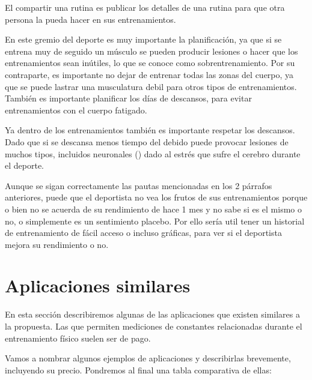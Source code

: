 El compartir una rutina es publicar los detalles de una rutina para que otra persona la pueda hacer en sus entrenamientos.

En este gremio del deporte es muy importante la planificación, ya que si se entrena muy de seguido un músculo se pueden producir lesiones o hacer que los entrenamientos sean inútiles, lo que se conoce como sobrentrenamiento. Por su contraparte, es importante no dejar de entrenar todas las zonas del cuerpo, ya que se puede lastrar una musculatura debil para otros tipos de entrenamientos. También es importante planificar los días de descansos, para evitar entrenamientos con el cuerpo fatigado. 

Ya dentro de los entrenamientos también es importante respetar los descansos. Dado que si se descansa menos tiempo del debido puede provocar lesiones de muchos tipos, incluidos neuronales (\cite{leonard2018impact}) dado al estrés que sufre el cerebro durante el deporte.

Aunque se sigan correctamente las pautas mencionadas en los 2 párrafos anteriores, puede que el deportista no vea los frutos de sus entrenamientos porque o bien no se acuerda de su rendimiento de hace 1 mes y no sabe si es el mismo o no, o simplemente es un sentimiento placebo. Por ello sería util tener un historial de entrenamiento de fácil acceso o incluso gráficas, para ver si el deportista mejora su rendimiento o no.

\section{Aplicaciones similares}

En esta sección describiremos algunas de las aplicaciones que existen similares a la propuesta. Las que permiten mediciones de constantes relacionadas durante el entrenamiento físico suelen ser de pago.

Vamos a nombrar algunos ejemplos de aplicaciones y describirlas brevemente, incluyendo su precio. Pondremos al final una tabla comparativa de ellas:

